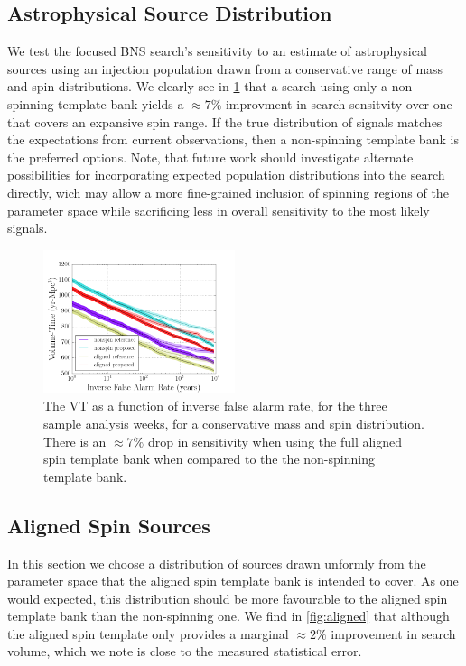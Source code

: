 \subsection{Astrophysical Source Distribution}

We test the focused BNS search's sensitivity to an estimate of astrophysical sources using an injection population drawn from a conservative range of mass and spin distributions. We clearly see in \ref{fig:rest} that a search using only a non-spinning template bank yields a $\approx{7\%}$ improvment in search sensitvity over one that covers an expansive spin range. If the true distribution of signals matches the expectations from current observations, then a non-spinning template bank is the preferred options. Note, that future work should investigate alternate possibilities for incorporating expected population distributions into the search directly, wich may allow a more fine-grained inclusion of spinning regions of the parameter space while sacrificing less in overall sensitivity to the most likely signals.

\begin{figure}
\includegraphics[width=0.5\textwidth]{papers/bns_o1_dev/figures/rest_combined.png}
\caption{\label{fig:rest} 
The VT as a function of inverse false alarm rate, for the
three sample analysis weeks, for a conservative mass and spin distribution. There is an $\approx 7\%$ drop in sensitivity when using the full aligned spin template bank when compared to the the non-spinning
template bank.}
\end{figure}

\subsection{Aligned Spin Sources}

In this section we choose a distribution of sources drawn unformly from the parameter space that the aligned spin template bank is intended to cover. As one would expected, this distribution should be more favourable to the aligned spin template bank than the non-spinning one. We find in \ref{fig:aligned} that although the aligned spin template only provides a marginal $\approx 2\%$ improvement in search volume, which we note is close to the measured statistical error. 

